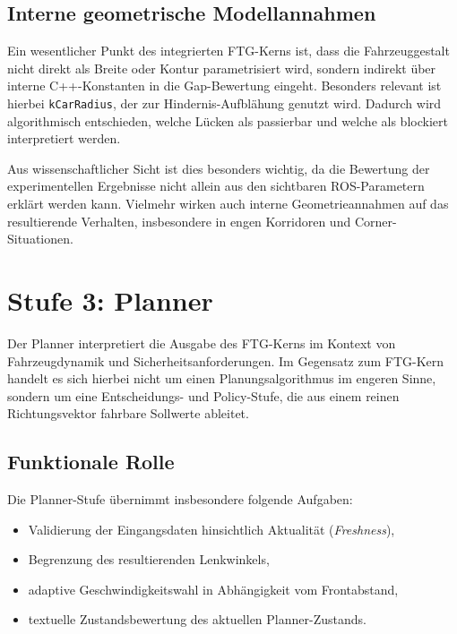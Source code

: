\subsection{Interne geometrische Modellannahmen}

Ein wesentlicher Punkt des integrierten FTG-Kerns ist, dass die Fahrzeuggestalt nicht direkt als Breite oder Kontur parametrisiert wird, sondern indirekt über interne C++-Konstanten in die Gap-Bewertung eingeht. Besonders relevant ist hierbei \texttt{kCarRadius}, der zur Hindernis-Aufblähung genutzt wird. Dadurch wird algorithmisch entschieden, welche Lücken als passierbar und welche als blockiert interpretiert werden.

Aus wissenschaftlicher Sicht ist dies besonders wichtig, da die Bewertung der experimentellen Ergebnisse nicht allein aus den sichtbaren ROS-Parametern erklärt werden kann. Vielmehr wirken auch interne Geometrieannahmen auf das resultierende Verhalten, insbesondere in engen Korridoren und Corner-Situationen.

\section{Stufe 3: Planner}
\label{sec:planner_stage}

Der Planner interpretiert die Ausgabe des FTG-Kerns im Kontext von Fahrzeugdynamik und Sicherheitsanforderungen. Im Gegensatz zum FTG-Kern handelt es sich hierbei nicht um einen Planungsalgorithmus im engeren Sinne, sondern um eine Entscheidungs- und Policy-Stufe, die aus einem reinen Richtungsvektor fahrbare Sollwerte ableitet.

\subsection{Funktionale Rolle}

Die Planner-Stufe übernimmt insbesondere folgende Aufgaben:

\begin{itemize}
    \item Validierung der Eingangsdaten hinsichtlich Aktualität (\textit{Freshness}),
    \item Begrenzung des resultierenden Lenkwinkels,
    \item adaptive Geschwindigkeitswahl in Abhängigkeit vom Frontabstand,
    \item textuelle Zustandsbewertung des aktuellen Planner-Zustands.
\end{itemize}


